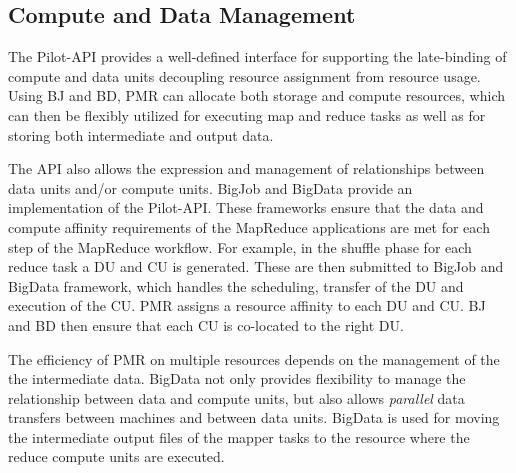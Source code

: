 \documentclass{acm_proc_article-sp}
\newcommand{\alnote}[1]{ {\textcolor{blue} { ***andreL: #1 }}}
\newcommand{\alnote}[1]{}
\newcommand{\upp}{\vspace*{-0.5em}}
\begin{document}
\upp
\subsection{Compute and Data Management}

The Pilot-API provides a well-defined interface for supporting the
late-binding of compute and data units decoupling resource assignment
from resource usage. Using BJ and BD, PMR can allocate both storage
and compute resources, which can then be flexibly utilized for
executing map and reduce tasks as well as for storing both
intermediate and output data.

The API also allows the expression and management of relationships
between data units and/or compute units.  BigJob and BigData provide
an implementation of the Pilot-API.  These frameworks ensure that the
data and compute affinity requirements of the MapReduce applications
are met for each step of the MapReduce workflow. For example, in the
shuffle phase for each reduce task a DU and CU is generated. These are
then submitted to BigJob and BigData framework, which handles the
scheduling, transfer of the DU and execution of the CU. PMR assigns a
resource affinity to each DU and CU. BJ and BD then ensure that each
CU is co-located to the right DU.



% 

The efficiency of PMR  on multiple resources depends on
the management of the the intermediate data. BigData not only
provides flexibility to manage the relationship between data and
compute units, but also allows {\it parallel} data transfers between
machines and between data units.  BigData is used for moving the
intermediate output files of the mapper tasks to the resource where
the reduce compute units are executed.  
\end{document}
